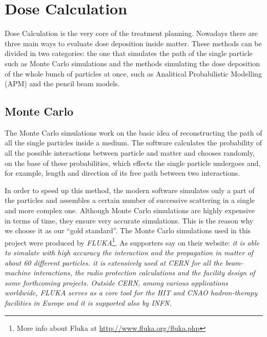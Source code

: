 \documentclass[12pt, a4paper, twoside]{book}
\begin{document}
\section{Dose Calculation}
Dose Calculation is the very core of the treatment planning. 
Nowadays there are three main ways to evaluate dose deposition inside matter. These methods can be divided in two categories: the one that simulates the path of the single particle such as Monte Carlo simulations and the methods simulating the dose deposition of the whole bunch of particles at once, such as Analitical Probabilistic Modelling (APM) and the pencil beam models.




\subsection{Monte Carlo}
The Monte Carlo simulations work on the basic idea of reconstructing the path of all the single particles inside a medium. The software calculates the probability of all the possible interactions between particle and matter and chooses randomly, on the base of these probabilities, which effects the single particle undergoes and, for example, length and direction of its free path between two interactions.

In order to speed up this method, the modern software simulates only a part of the particles and assembles a certain number of successive scattering in a single and more complex one. Although Monte Carlo simulations are highly expensive in terms of time, they ensure very accurate simulations. This is the reason why we choose it as our ``gold standard''.
The Monte Carlo simulations used in this project were produced by \emph{FLUKA}\footnote{More info about Fluka at \url{http://www.fluka.org/fluka.php}}. As supporters say on their website: \emph{it is able to simulate with high accuracy the interaction and the propagation in matter of about 60 different particles. it is extensively used at CERN for all the beam-machine interactions, the radio protection calculations and the facility design of some forthcoming projects. 
Outside CERN, among various applications worldwide, FLUKA serves as a core tool for the HIT and CNAO hadron-therapy facilities in Europe and it is supported also by \emph{INFN}.}
\end{document}

